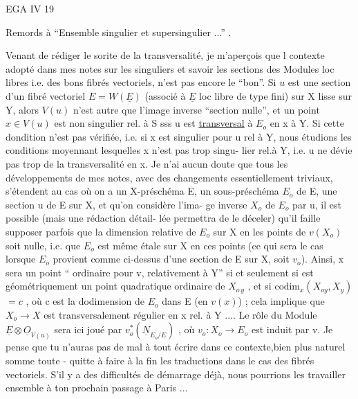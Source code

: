 
EGA IV 19

Remords à ``Ensemble singulier et supersingulier ...'' .

Venant de rédiger le sorite de la transversalité, je m'aperçois que l
contexte adopté dans mes notes sur les  singuliers et 
savoir les sections des Modules loc libres i.e. des bons fibrés vectoriels,
n'est pas encore le ``bon''. Si $u$ est une section d'un fibré vectoriel
$E = W(\underline{E})$ (associé à $\underline{E}$ loc libre de type fini) sur X lisse sur Y, alors $V(u)$
n'est autre que l'image inverse    ``section nulle'', et un point $x\in V(u)$
est non singulier  rel. à S sss u est \uline{transversal} à $E_{o}$ en x  à Y.
Si cette dondition n'est pas vérifiée, i.e. si x est singulier pour u rel à
Y, nous étudions les conditions moyennant lesquelles x n'est pas trop singu-%
lier rel.à Y, i.e. u ne dévie pas trop de la transversalité en x. Je n'ai
aucun doute que tous les développements de mes notes, avec des changements
essentiellement triviaux, s'étendent au cas où on a un X-préschéma E, un
sous-préschéma $E_{o}$ de E, une section  u de E sur X, et qu'on considère l'ima-%
ge inverse $X_{o}$ de $E_{o}$ par u,  il est possible (mais  une rédaction détail-%
lée permettra de le déceler) qu'il faille supposer parfois que la dimension
relative de $E_{o}$ sur X en les points de $v(X_{o})$ soit nulle, i.e. que $E_{o}$ est
même étale sur X en ces points (ce qui sera le cas lorsque $E_{o}$ provient comme
ci-dessus d'une section de E sur X, soit $v_{o}$). Ainsi, x sera un point
``  ordinaire pour v, relativement à Y'' si et seulement si   est
géométriquement un point quadratique ordinaire de $X_{o\,y}$ , et si $\mathrm{codim}_{x}(X_{oy},X_{y})$
$= c$ , où c est la dodimension de $E_{o}$ dans E (en $v(x)$) ; cela implique que
$X_{o}\longrightarrow X$ est  transversalement régulier en x rel. à Y .... Le rôle du Module
$\underline{E}\otimes\underline{O}_{V(u)}$ sera ici joué par $v_{o}^{*}(\underline{N}_{E_{o}/E})$ , où $v_{o}:X_{o}\longrightarrow E_{o}$ est induit par v. Je
pense que tu n'auras pas de mal à tout écrire dans ce contexte,bien plus
naturel somme toute - quitte à faire à la fin les traductions dans le cas
des fibrés vectoriels. S'il y a des difficultés de démarrage déjà, nous
pourrions les travailler ensemble à ton prochain passage à Paris ... 
